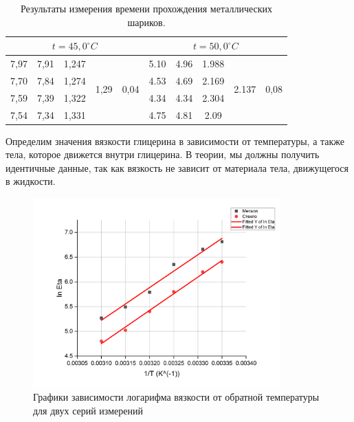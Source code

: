 \documentclass[a4paper, 12pt]{article}%
\begin{document}
\begin{table}[h]
\begin{tabular}{|c|c|c|c|c||c|c|c|c|c|}
\multicolumn{5}{|c|}{$t = 45,0^\circ C $}                                              & \multicolumn{5}{c|}{$t = 50,0^\circ C $}                                             \\ \hline
7,97  & 7,91  & 1,247 & \multirow{4}{*}{1,29} & \multirow{4}{*}{0,04} & 5.10 & 4.96 & 1.988 & \multirow{4}{*}{2.137} & \multirow{4}{*}{0,08} \\ \cline{1-3} \cline{6-8}
7,70  & 7,84  & 1,274 &                       &                       & 4.53 & 4.69 & 2.169 &                       &                       \\ \cline{1-3} \cline{6-8}
7,59  & 7,39  & 1,322 &                       &                       & 4.34 & 4.34 & 2.304 &                       &                       \\ \cline{1-3} \cline{6-8}
7,54  & 7,34  & 1,331 &                       &                       & 4.75 & 4.81 & 2.09 &                       &                       \\ \hline
\end{tabular}
\caption{Результаты измерения времени прохождения металлических шариков.}
\label{tab:metal_balls_measuring}
\end{table}


\newpage
Определим значения вязкости глицерина в зависимости от температуры, а также тела, которое движется внутри глицерина. В теории, мы должны получить идентичные данные, так как вязкость не зависит от материала тела, движущегося в жидкости.

\begin{figure}[h!]
	\begin{center}
		\includegraphics[width = 0.85\textwidth]{labphoto31.png}
		\caption{Графики зависимости логарифма вязкости от обратной температуры для двух серий измерений}
		\label{fig:graph_one}
	\end{center}
\end{figure}
\end{document}
